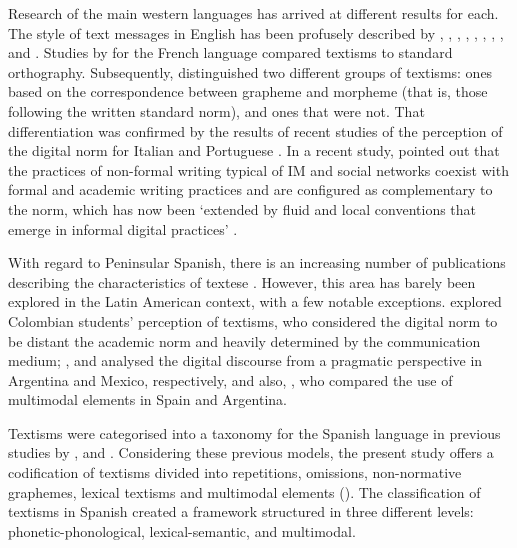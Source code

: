 \documentclass[english]{textolivre}
\begin{document}
Research of the main western languages has arrived at different results for each. The style of text messages in English has been profusely described by \textcite{Thurlow2003}, \textcite{Crystal2008a}, \textcite{Plester2009}, \textcite{Kemp2011}, \textcite{DeJonge2012}, \textcite{Lyddy2014}, \textcite{Wood2014}, \textcite{Waldron2017}, and \textcite{Kemp2017}. Studies by \textcite{Bouillaud2007} for the French language compared textisms to standard orthography. Subsequently, \textcite{Bernicot2014} distinguished two different groups of textisms: ones based on the correspondence between grapheme and morpheme (that is, those following the written standard norm), and ones that were not. That differentiation was confirmed by the results of recent studies of the perception of the digital norm for Italian \cite{Gomez-Camacho2016} and Portuguese \cite{Gomez-Camacho2017}. In a recent study, \textcite{Androutsopoulos2020} pointed out that the practices of non-formal writing typical of IM and social networks coexist with formal and academic writing practices and are configured as complementary to the norm, which has now been ‘extended by fluid and local conventions that emerge in informal digital practices’ \cite[p. 8]{Androutsopoulos2020}.

With regard to Peninsular Spanish, there is an increasing number of publications describing the characteristics of textese \cite{Calero2014, Caurcel2013, DominguezCuesta2005, GalanRodriguez2002, Llisterri2002, ManceraRueda2016, MasAlvarez2012a, VAZQUEZ-CANO2015}. However, this area has barely been explored in the Latin American context, with a few notable exceptions. \textcite{GiraldoGiraldo2018a} explored Colombian students’ perception of textisms, who considered the digital norm to be distant the academic norm and heavily determined by the communication medium; \textcite{Cantamutto2018, Cantamutto2019b}, and \textcite{Flores-Salgado2018} analysed the digital discourse from a pragmatic perspective in Argentina and Mexico, respectively, and also, \textcite{Cantamutto2018b, Cantamutto2019}, who compared the use of multimodal elements in Spain and Argentina. 

Textisms were categorised into a taxonomy for the Spanish language in previous studies by \textcite{Gomez-Camacho2007}, \textcite{Gomez-Camacho2018} and \textcite{Hunt-Gomez2020}. Considering these previous models, the present study offers a codification of textisms divided into repetitions, omissions, non-normative graphemes, lexical textisms and multimodal elements (). The classification of textisms in Spanish created a framework structured in three different levels: phonetic-phonological, lexical-semantic, and multimodal.
\end{document}
